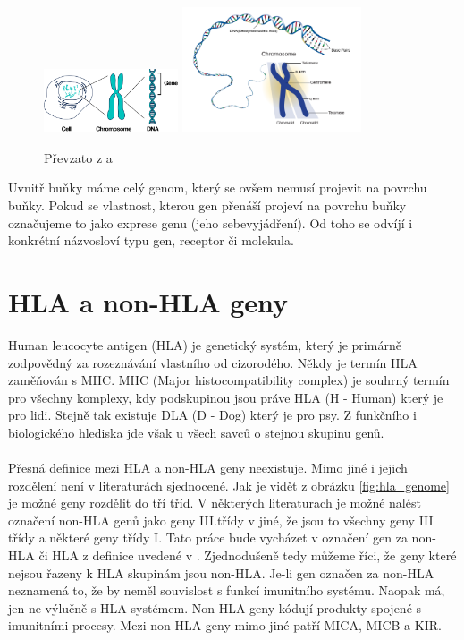 \documentclass[czech,DP]{thesiskiv}
\numberwithin{equation}{section}
\begin{document}
\begin{figure}[H]		
		\centering
		\includegraphics[width=150px]{./img/lidska_bunka.png}
		\includegraphics[width=200px]{./img/chromosome.jpg}
		\caption{Převzato z \cite{human_cell} a \cite{chromosome_structure}}
		\label{fig:chrmosome}
\end{figure}

\noindent
Uvnitř buňky máme celý genom, který se ovšem nemusí projevit na povrchu buňky. Pokud se vlastnost, kterou gen přenáší projeví na povrchu buňky označujeme to jako exprese genu (jeho sebevyjádření). Od toho se odvíjí i konkrétní názvosloví typu gen, receptor či molekula.


\section{HLA a non-HLA geny}
Human leucocyte antigen (HLA) je genetický systém, který je primárně zodpovědný za rozeznávání vlastního od cizorodého. Někdy je termín HLA zaměňován s MHC. MHC (Major histocompatibility complex) je souhrný termín pro všechny komplexy, kdy podskupinou jsou práve HLA (H - Human) který je pro lidi. Stejně tak existuje DLA (D - Dog) který je pro psy. Z funkčního i biologického hlediska jde však u všech savců o stejnou skupinu genů. \cite{KIR_transplantace_jindra}
\\
\\
Přesná definice mezi HLA a non-HLA geny neexistuje. Mimo jiné i jejich rozdělení není v literaturách sjednocené. Jak je vidět z obrázku \ref{fig:hla_genome} je možné geny rozdělit do tří tříd. V některých literaturach je možné nalést označení non-HLA genů jako geny III.třídy v jiné, že jsou to všechny geny III třídy a některé geny třídy I. Tato práce bude vycházet v označení gen za non-HLA či HLA z definice uvedené v \cite{imgt_hla_database}. Zjednodušeně tedy můžeme říci, že geny které nejsou řazeny k HLA skupinám jsou non-HLA. Je-li gen označen za non-HLA neznamená to, že by neměl souvislost s funkcí imunitního systému. Naopak má, jen ne výlučně s HLA systémem. Non-HLA geny kódují produkty spojené s imunitními procesy. Mezi non-HLA geny mimo jiné patří MICA, MICB a KIR. \cite{imgt_hla_database}
\end{document}
